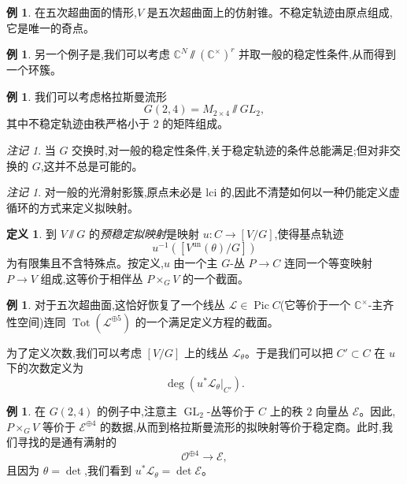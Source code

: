 \documentclass{amsart}
\theoremstyle{definition}
\newtheorem{defn}[thm]{定义}
\newtheorem{exm}[thm]{例}
\theoremstyle{remark}
\newtheorem{rmk}[thm]{注记}
\theoremstyle{plain}
\theoremstyle{definition}
\theoremstyle{remark}
\newcommand{\C}{\mathbb{C}}
\newcommand{\mc}[1]{\mathcal{#1}}
\newcommand{\mr}[1]{\mathrm{#1}}
\newcommand{\on}[1]{\operatorname{#1}}
\newcommand{\1}{\mathbf{1}}
\newcommand{\2}{\mathbf{2}}
\newcommand{\3}{\mathbf{3}}
\DeclareMathOperator{\Pic}{Pic}
\begin{document}
\begin{exm}
    在五次超曲面的情形,\(V\) 是五次超曲面上的仿射锥。不稳定轨迹由原点组成,它是唯一的奇点。
\end{exm}

\begin{exm}
    另一个例子是,我们可以考虑 \(\C^N \sslash (\C^{\times})^r\) 并取一般的稳定性条件,从而得到一个环簇。
\end{exm}

\begin{exm}
    我们可以考虑格拉斯曼流形
    \[ G(2,4) = M_{2\times 4} \sslash GL_2, \]
    其中不稳定轨迹由秩严格小于 \(2\) 的矩阵组成。
\end{exm}

\begin{rmk}
    当 \(G\) 交换时,对一般的稳定性条件,关于稳定轨迹的条件总能满足;但对非交换的 \(G\),这并不总是可能的。
\end{rmk}

\begin{rmk}
    对一般的光滑射影簇,原点未必是 lci 的,因此不清楚如何以一种仍能定义虚循环的方式来定义拟映射。
\end{rmk}

\begin{defn}
    到 \(V \sslash G\) 的\textit{预稳定拟映射}是映射 \(u \colon C \to [V/G]\),使得基点轨迹
    \[ u^{-1}([V^{\mr{un}}(\theta) / G]) \]
    为有限集且不含特殊点。按定义,\(u\) 由一个主 \(G\)-丛 \(P \to C\) 连同一个等变映射 \(P \to V\) 组成,这等价于相伴丛 \(P \times_G V\) 的一个截面。
\end{defn}

\begin{exm}
    对于五次超曲面,这恰好恢复了一个线丛 \(\mc{L} \in \Pic C\)(它等价于一个 \(\C^{\times}\)-主齐性空间)连同 \(\on{Tot}(\mc{L}^{\oplus 5})\) 的一个满足定义方程的截面。
\end{exm}

为了定义次数,我们可以考虑 \([V/G]\) 上的线丛 \(\mc{L}_{\theta}\)。于是我们可以把 \(C' \subset C\) 在 \(u\) 下的次数定义为
\[ \deg (u^* \mc{L}_{\theta}|_{C'}). \]

\begin{exm}
    在 \(G(2,4)\) 的例子中,注意主 \(\on{GL}_2\)-丛等价于 \(C\) 上的秩 \(2\) 向量丛 \(\mc{E}\)。因此,\(P \times_G V\) 等价于 \(\mc{E}^{\oplus 4}\) 的数据,从而到格拉斯曼流形的拟映射等价于稳定商。此时,我们寻找的是通有满射的
    \[ \mc{O}^{\oplus 4} \to \mc{E}, \]
    且因为 \(\theta = \det\),我们看到 \(u^* \mc{L}_{\theta} = \det \mc{E}\)。
\end{exm}
\end{document}
